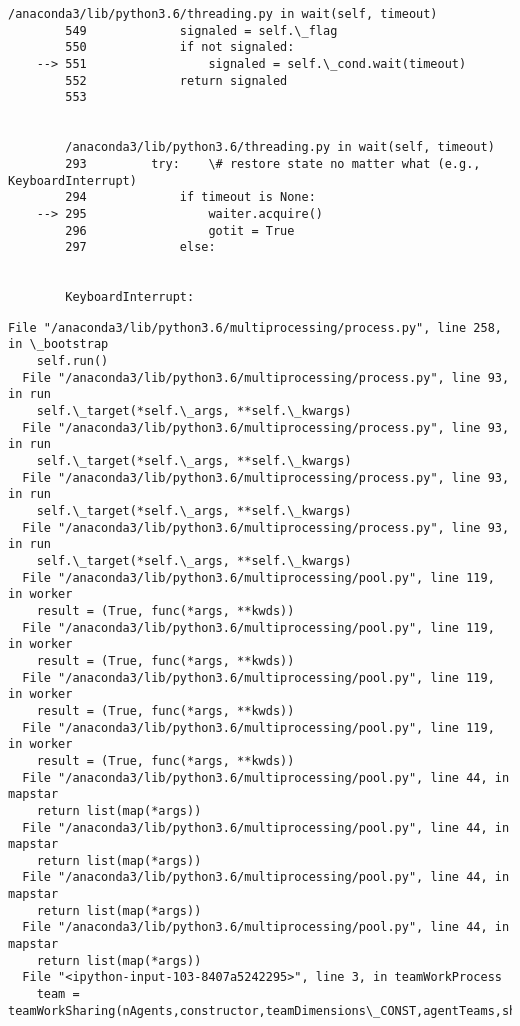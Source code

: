 \documentclass[11pt]{article}
\begin{document}
\begin{Verbatim}[commandchars=\\\{\}]
        /anaconda3/lib/python3.6/threading.py in wait(self, timeout)
        549             signaled = self.\_flag
        550             if not signaled:
    --> 551                 signaled = self.\_cond.wait(timeout)
        552             return signaled
        553 


        /anaconda3/lib/python3.6/threading.py in wait(self, timeout)
        293         try:    \# restore state no matter what (e.g., KeyboardInterrupt)
        294             if timeout is None:
    --> 295                 waiter.acquire()
        296                 gotit = True
        297             else:


        KeyboardInterrupt: 

    \end{Verbatim}

    \begin{Verbatim}[commandchars=\\\{\}]
  File "/anaconda3/lib/python3.6/multiprocessing/process.py", line 258, in \_bootstrap
    self.run()
  File "/anaconda3/lib/python3.6/multiprocessing/process.py", line 93, in run
    self.\_target(*self.\_args, **self.\_kwargs)
  File "/anaconda3/lib/python3.6/multiprocessing/process.py", line 93, in run
    self.\_target(*self.\_args, **self.\_kwargs)
  File "/anaconda3/lib/python3.6/multiprocessing/process.py", line 93, in run
    self.\_target(*self.\_args, **self.\_kwargs)
  File "/anaconda3/lib/python3.6/multiprocessing/process.py", line 93, in run
    self.\_target(*self.\_args, **self.\_kwargs)
  File "/anaconda3/lib/python3.6/multiprocessing/pool.py", line 119, in worker
    result = (True, func(*args, **kwds))
  File "/anaconda3/lib/python3.6/multiprocessing/pool.py", line 119, in worker
    result = (True, func(*args, **kwds))
  File "/anaconda3/lib/python3.6/multiprocessing/pool.py", line 119, in worker
    result = (True, func(*args, **kwds))
  File "/anaconda3/lib/python3.6/multiprocessing/pool.py", line 119, in worker
    result = (True, func(*args, **kwds))
  File "/anaconda3/lib/python3.6/multiprocessing/pool.py", line 44, in mapstar
    return list(map(*args))
  File "/anaconda3/lib/python3.6/multiprocessing/pool.py", line 44, in mapstar
    return list(map(*args))
  File "/anaconda3/lib/python3.6/multiprocessing/pool.py", line 44, in mapstar
    return list(map(*args))
  File "/anaconda3/lib/python3.6/multiprocessing/pool.py", line 44, in mapstar
    return list(map(*args))
  File "<ipython-input-103-8407a5242295>", line 3, in teamWorkProcess
    team = teamWorkSharing(nAgents,constructor,teamDimensions\_CONST,agentTeams,showViz=showViz,speed=None,pComm=pComm,steps=steps,groupConformityBias=True,soBias=True,aiScore=aiScore,aiRange=aiRange)

\end{Verbatim}
\end{document}
